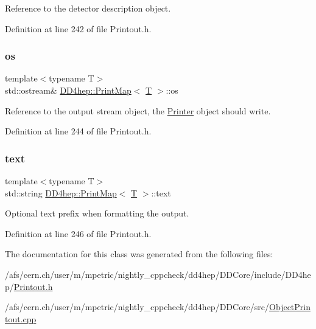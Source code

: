 Reference to the detector description object. 



Definition at line 242 of file Printout.\+h.

\hypertarget{struct_d_d4hep_1_1_print_map_af89e40c312ce2cf93e6956d3d03b704b}{}\label{struct_d_d4hep_1_1_print_map_af89e40c312ce2cf93e6956d3d03b704b} 
\subsubsection{\texorpdfstring{os}{os}}
{\footnotesize\ttfamily template$<$typename T$>$ \\
std\+::ostream\& \hyperlink{struct_d_d4hep_1_1_print_map}{D\+D4hep\+::\+Print\+Map}$<$ \hyperlink{class_t}{T} $>$\+::os}



Reference to the output stream object, the \hyperlink{struct_d_d4hep_1_1_printer}{Printer} object should write. 



Definition at line 244 of file Printout.\+h.

\hypertarget{struct_d_d4hep_1_1_print_map_ad776e7ab0023498d02708495e5dd0b1c}{}\label{struct_d_d4hep_1_1_print_map_ad776e7ab0023498d02708495e5dd0b1c} 
\subsubsection{\texorpdfstring{text}{text}}
{\footnotesize\ttfamily template$<$typename T$>$ \\
std\+::string \hyperlink{struct_d_d4hep_1_1_print_map}{D\+D4hep\+::\+Print\+Map}$<$ \hyperlink{class_t}{T} $>$\+::text}



Optional text prefix when formatting the output. 



Definition at line 246 of file Printout.\+h.



The documentation for this class was generated from the following files\+:\begin{DoxyCompactItemize}
\item 
/afs/cern.\+ch/user/m/mpetric/nightly\+\_\+cppcheck/dd4hep/\+D\+D\+Core/include/\+D\+D4hep/\hyperlink{_printout_8h}{Printout.\+h}\item 
/afs/cern.\+ch/user/m/mpetric/nightly\+\_\+cppcheck/dd4hep/\+D\+D\+Core/src/\hyperlink{_object_printout_8cpp}{Object\+Printout.\+cpp}\end{DoxyCompactItemize}
